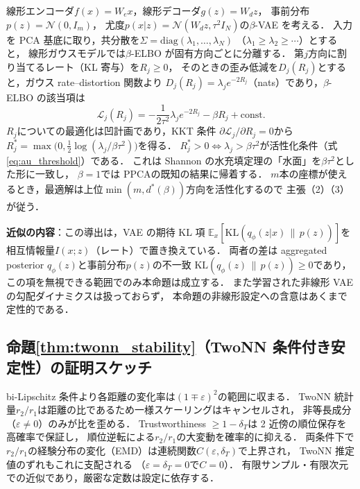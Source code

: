 \documentclass[11pt,a4paper]{jsarticle}
\newcommand{\dstar}{d^{*}(\beta)}
\begin{document}
線形エンコーダ$f(x) = W_e x$，線形デコーダ$g(z) = W_d z$，
事前分布$p(z) = \mathcal{N}(0, I_m)$，
尤度$p(x|z) = \mathcal{N}(W_d z, \tau^2 I_N)$の$\beta$-VAE を考える．
入力を PCA 基底に取り，共分散を$\Sigma = \mathrm{diag}(\lambda_1, \ldots, \lambda_N)$
（$\lambda_1 \geq \lambda_2 \geq \cdots$）とすると，
線形ガウスモデルでは$\beta$-ELBO が固有方向ごとに分離する．
第$j$方向に割り当てるレート（KL 寄与）を$R_j \geq 0$，
そのときの歪み低減を$D_j(R_j)$とすると，ガウス rate--distortion 関数より
$D_j(R_j) = \lambda_j e^{-2R_j}$（nats）であり，$\beta$-ELBO の該当項は
\begin{equation}
  \mathcal{L}_j(R_j) = -\frac{1}{2\tau^2}\lambda_j e^{-2R_j} - \beta R_j + \text{const.}
\end{equation}
$R_j$についての最適化は凹計画であり，KKT 条件
$\partial \mathcal{L}_j / \partial R_j = 0$から
$R_j^* = \max\bigl(0, \tfrac{1}{2}\log(\lambda_j / \beta\tau^2)\bigr)$を得る．
$R_j^* > 0 \iff \lambda_j > \beta\tau^2$が活性化条件（式\eqref{eq:au_threshold}）である．
これは Shannon の水充填定理\cite{cover2006elements}の「水面」を$\beta\tau^2$とした形に一致し，
$\beta = 1$では PPCA\cite{tippingbishop1999ppca}の既知の結果に帰着する．
$m$本の座標が使えるとき，最適解は上位$\min(m, \dstar)$方向を活性化するので
主張（2）（3）が従う．

\textbf{近似の内容}：この導出は，VAE の期待 KL 項
$\mathbb{E}_x[\mathrm{KL}(q_\phi(z|x)\,\|\,p(z))]$を
相互情報量$I(x; z)$（レート）で置き換えている．
両者の差は aggregated posterior $q_\phi(z)$と事前分布$p(z)$の不一致
$\mathrm{KL}(q_\phi(z)\,\|\,p(z)) \geq 0$であり，
この項を無視できる範囲でのみ本命題は成立する．
また学習された非線形 VAE の勾配ダイナミクスは扱っておらず，
本命題の非線形設定への含意はあくまで定性的である．

\subsection{命題\ref{thm:twonn_stability}（TwoNN 条件付き安定性）の証明スケッチ}

bi-Lipschitz 条件より各距離の変化率は$(1 \mp \varepsilon)^2$の範囲に収まる．
TwoNN 統計量$r_2/r_1$は距離の比であるため一様スケーリングはキャンセルされ，
非等長成分（$\varepsilon \neq 0$）のみが比を歪める．
Trustworthiness $\geq 1 - \delta_T$は 2 近傍の順位保存を高確率で保証し，
順位逆転による$r_2/r_1$の大変動を確率的に抑える．
両条件下で$r_2/r_1$の経験分布の変化（EMD）は連続関数$C(\varepsilon, \delta_T)$で上界され，
TwoNN 推定値のずれもこれに支配される
（$\varepsilon = \delta_T = 0$で$C = 0$）．
有限サンプル・有限次元での近似であり，厳密な定数は設定に依存する．
\end{document}
